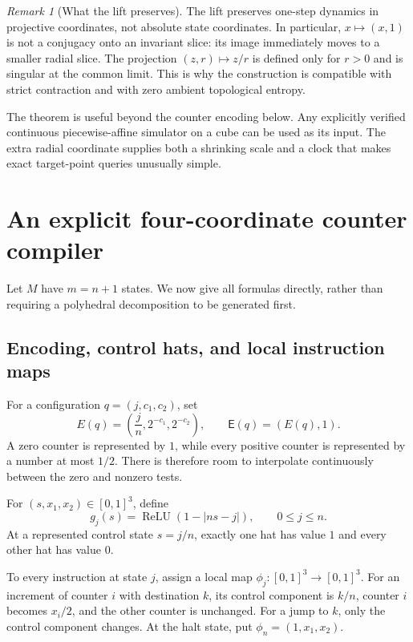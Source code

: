 \documentclass[11pt,letterpaper]{article}
\numberwithin{equation}{section}
\theoremstyle{definition}
\theoremstyle{remark}
\newtheorem{remark}[theorem]{Remark}
\newcommand{\srcmark}[1]{\par\noindent{\small\itshape [source~#1]}\par}
\newcommand{\ReLU}{\operatorname{ReLU}}
\newcommand{\Enc}{\mathsf E}
\begin{document}
\begin{remark}[What the lift preserves]
The lift preserves one-step dynamics in projective coordinates, not absolute
state coordinates. In particular, $x\mapsto(x,1)$ is not a conjugacy onto an
invariant slice: its image immediately moves to a smaller radial slice.
The projection $(z,r)\mapsto z/r$ is defined only for $r>0$ and is singular
at the common limit. This is why the construction is compatible with
strict contraction and with zero ambient topological entropy.
\end{remark}

The theorem is useful beyond the counter encoding below. Any explicitly
verified continuous piecewise-affine simulator on a cube can be used as its
input. The extra radial coordinate supplies both a shrinking scale and a
clock that makes exact target-point queries unusually simple.

\section{An explicit four-coordinate counter compiler}\label{pqc:sc:sec:compiler}
\srcmark{14}

Let $M$ have $m=n+1$ states. We now give all formulas directly, rather than
requiring a polyhedral decomposition to be generated first.

\subsection{Encoding, control hats, and local instruction maps}

For a configuration $q=(j,c_1,c_2)$, set
\begin{equation}\label{pqc:sc:eq:encoding}
 E(q)=\left(\frac{j}{n},2^{-c_1},2^{-c_2}\right),\qquad
 \Enc(q)=(E(q),1).
\end{equation}
A zero counter is represented by $1$, while every positive counter is
represented by a number at most $1/2$. There is therefore room to interpolate
continuously between the zero and nonzero tests.

For $(s,x_1,x_2)\in[0,1]^3$, define
\[
 g_j(s)=\ReLU(1-|ns-j|),\qquad 0\le j\le n.
\]
At a represented control state $s=j/n$, exactly one hat has value $1$ and
every other hat has value $0$.

To every instruction at state $j$, assign a local map
$\phi_j:[0,1]^3\to[0,1]^3$. For an increment of counter $i$ with destination
$k$, its control component is $k/n$, counter $i$ becomes $x_i/2$, and the
other counter is unchanged. For a jump to $k$, only the control component
changes. At the halt state, put $\phi_n=(1,x_1,x_2)$.
\end{document}
